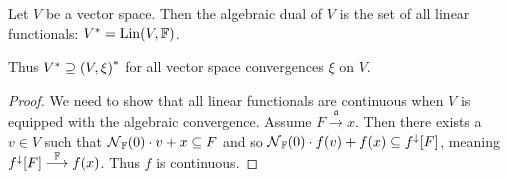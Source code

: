 \begin{proposition} \label{algebraicDual}
Let $V$ be a vector space. Then the algebraic dual of $V$ is the set of all linear functionals: $V^* = \operatorname{Lin}(V,\mathbb{F})$.

Thus $V^* \supseteq \left( V,\xi \right)^*$ for all vector space convergences $\xi$ on $V$.
\end{proposition}
\begin{proof}
We need to show that all linear functionals are continuous when $V$ is equipped with the algebraic convergence. Assume $F\overset{\mathfrak{a}}{\longrightarrow} x$. Then there exists a $v\in V$ such that $\operatorname{\mathcal{N}}_{\mathbb{F}}(0)\cdot v+x \subseteq F$ and so $\operatorname{\mathcal{N}}_{\mathbb{F}}(0)\cdot f(v)+f(x) \subseteq f^\downarrow[F]$, meaning $f^\downarrow[F] \overset{\mathbb{F}}{\longrightarrow} f(x)$. Thus $f$ is continuous.
\end{proof}


